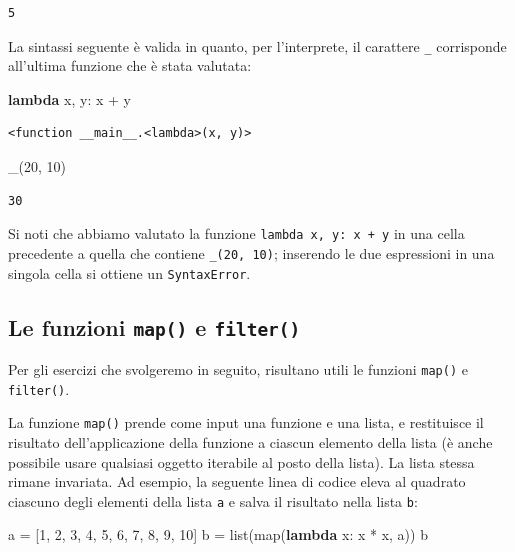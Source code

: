 \documentclass[
  letterpaper,
  krantz2]{{[}./krantz{]}}
\newenvironment{Shaded}{\begin{snugshade}}{\end{snugshade}}
\newcommand{\BuiltInTok}[1]{\textcolor[rgb]{0.00,0.23,0.31}{#1}}
\newcommand{\DecValTok}[1]{\textcolor[rgb]{0.68,0.00,0.00}{#1}}
\newcommand{\KeywordTok}[1]{\textcolor[rgb]{0.00,0.23,0.31}{\textbf{#1}}}
\newcommand{\NormalTok}[1]{\textcolor[rgb]{0.00,0.23,0.31}{#1}}
\newcommand{\OperatorTok}[1]{\textcolor[rgb]{0.37,0.37,0.37}{#1}}
\begin{document}
\begin{verbatim}
5
\end{verbatim}

La sintassi seguente è valida in quanto, per l'interprete, il carattere
\texttt{\_} corrisponde all'ultima funzione che è stata valutata:

\begin{Shaded}
\begin{Highlighting}[]
\KeywordTok{lambda}\NormalTok{ x, y: x }\OperatorTok{+}\NormalTok{ y}
\end{Highlighting}
\end{Shaded}

\begin{verbatim}
<function __main__.<lambda>(x, y)>
\end{verbatim}

\begin{Shaded}
\begin{Highlighting}[]
\NormalTok{\_(}\DecValTok{20}\NormalTok{, }\DecValTok{10}\NormalTok{)}
\end{Highlighting}
\end{Shaded}

\begin{verbatim}
30
\end{verbatim}

Si noti che abbiamo valutato la funzione
\texttt{lambda\ x,\ y:\ x\ +\ y} in una cella precedente a quella che
contiene \texttt{\_(20,\ 10)}; inserendo le due espressioni in una
singola cella si ottiene un \texttt{SyntaxError}.

\subsection{\texorpdfstring{Le funzioni \texttt{map()} e
\texttt{filter()}}{Le funzioni map() e filter()}}\label{le-funzioni-map-e-filter}

Per gli esercizi che svolgeremo in seguito, risultano utili le funzioni
\texttt{map()} e \texttt{filter()}.

La funzione \texttt{map()} prende come input una funzione e una lista, e
restituisce il risultato dell'applicazione della funzione a ciascun
elemento della lista (è anche possibile usare qualsiasi oggetto
iterabile al posto della lista). La lista stessa rimane invariata. Ad
esempio, la seguente linea di codice eleva al quadrato ciascuno degli
elementi della lista \texttt{a} e salva il risultato nella lista
\texttt{b}:

\begin{Shaded}
\begin{Highlighting}[]
\NormalTok{a }\OperatorTok{=}\NormalTok{ [}\DecValTok{1}\NormalTok{, }\DecValTok{2}\NormalTok{, }\DecValTok{3}\NormalTok{, }\DecValTok{4}\NormalTok{, }\DecValTok{5}\NormalTok{, }\DecValTok{6}\NormalTok{, }\DecValTok{7}\NormalTok{, }\DecValTok{8}\NormalTok{, }\DecValTok{9}\NormalTok{, }\DecValTok{10}\NormalTok{]}
\NormalTok{b }\OperatorTok{=} \BuiltInTok{list}\NormalTok{(}\BuiltInTok{map}\NormalTok{(}\KeywordTok{lambda}\NormalTok{ x: x }\OperatorTok{*}\NormalTok{ x, a))}
\NormalTok{b}
\end{Highlighting}
\end{Shaded}
\end{document}
